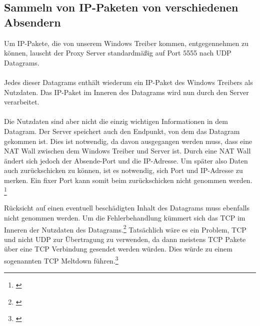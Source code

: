 \subsection{Sammeln von IP-Paketen von verschiedenen Absendern}
Um IP-Pakete, die von unserem Windows Treiber kommen, entgegennehmen zu können, lauscht der Proxy Server standardmäßig auf Port 5555 nach UDP Datagrams. 
\\\\
Jedes dieser Datagrams enthält wiederum ein IP-Paket des Windows Treibers als Nutzdaten. Das IP-Paket im Inneren des Datagrams wird nun durch den Server verarbeitet.
\\\\
Die Nutzdaten sind aber nicht die einzig wichtigen Informationen in dem Datagram. Der Server speichert auch den Endpunkt, von dem das Datagram gekommen ist. Dies ist notwendig, da davon ausgegangen werden muss, dass eine NAT Wall zwischen dem Windows Treiber und Server ist. Durch eine NAT Wall ändert sich jedoch der Absende-Port und die IP-Adresse. Um später also Daten auch zurückschicken zu können, ist es notwendig, sich Port und IP-Adresse zu merken. Ein fixer Port kann somit beim zurückschicken nicht genommen werden. \footnote[1]{\cite[Vgl.][]{SRV5}}
\\\\ 
Rücksicht auf einen eventuell beschädigten Inhalt des Datagrams muss ebenfalls nicht genommen werden. Um die Fehlerbehandlung kümmert sich das TCP im Inneren der Nutzdaten des Datagrams.\footnote[2]{\cite[Vgl.][]{SRV6}} Tatsächlich wäre es ein Problem, TCP und nicht UDP zur Übertragung zu verwenden, da dann meistens TCP Pakete über eine TCP Verbindung gesendet werden würden. Dies würde zu einem sogenannten TCP Meltdown führen.\footnote[3]{\cite[Vgl.][]{SRV7}} 

